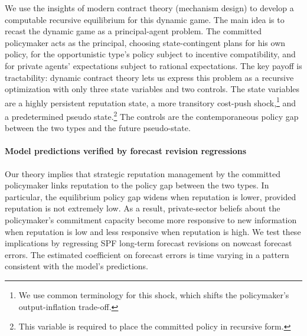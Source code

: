 \documentclass[12pt,letter,leqno]{article}
\theoremstyle{asn}
\theoremstyle{lem}
\theoremstyle{slem}
\theoremstyle{prop}
\theoremstyle{appprop}
\theoremstyle{rem}
\theoremstyle{defn}
\begin{document}
We use the insights of modern contract theory (mechanism design) to develop a
computable recursive equilibrium for this dynamic game. The main idea is to recast the dynamic game as a principal-agent problem. The committed policymaker acts as the principal, choosing state-contingent plans for his own policy, for the opportunistic type's policy subject to incentive compatibility, and for private agents' expectations subject to rational expectations. The key payoff is tractability: dynamic contract theory lets us express this problem as a recursive optimization with only three state variables and two controls. The state variables are a highly persistent reputation state, a more transitory cost-push shock,\footnote{We use common terminology for this shock, which shifts the policymaker's output-inflation trade-off.} and a predetermined pseudo state.\footnote{This variable is required to place the committed policy in recursive form.} The controls are the contemporaneous policy gap between the two types and the future pseudo-state.

\paragraph{Model predictions verified by forecast revision regressions} Our theory implies that strategic reputation management by the committed policymaker links reputation to the policy gap between the two types. In particular, the equilibrium policy gap widens when reputation is lower, provided reputation is not extremely low. As a result, private-sector beliefs about the policymaker's commitment capacity become more responsive to new information when reputation is low and less responsive when reputation is high. We test these implications by regressing SPF long-term forecast revisions on nowcast forecast errors. The estimated coefficient on forecast errors is time varying in a pattern consistent with the model's predictions. 
\end{document}
